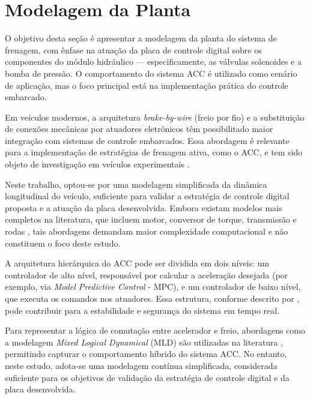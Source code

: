 \section{Modelagem da Planta}
\label{sec:controle-4-1}

O objetivo desta seção é apresentar a modelagem da planta do sistema de frenagem, com ênfase na atuação da placa de controle digital sobre os componentes do módulo hidráulico — especificamente, as válvulas solenoides e a bomba de pressão. O comportamento do sistema ACC é utilizado como cenário de aplicação, mas o foco principal está na implementação prática do controle embarcado.

Em veículos modernos, a arquitetura \textit{brake-by-wire} (freio por fio) e a substituição de conexões mecânicas por atuadores eletrônicos têm possibilitado maior integração com sistemas de controle embarcados. Essa abordagem é relevante para a implementação de estratégias de frenagem ativa, como o ACC, e tem sido objeto de investigação em veículos experimentais \cite{Pananurak2009}.

Neste trabalho, optou-se por uma modelagem simplificada da dinâmica longitudinal do veículo, suficiente para validar a estratégia de controle digital proposta e a atuação da placa desenvolvida. Embora existam modelos mais completos na literatura, que incluem motor, conversor de torque, transmissão e rodas \cite{LuuAndLupu2019}, tais abordagens demandam maior complexidade computacional e não constituem o foco deste estudo.

A arquitetura hierárquica do ACC pode ser dividida em dois níveis: um controlador de alto nível, responsável por calcular a aceleração desejada (por exemplo, via \textit{Model Predictive Control} - MPC), e um controlador de baixo nível, que executa os comandos nos atuadores. Essa estrutura, conforme descrito por , pode contribuir para a estabilidade e segurança do sistema em tempo real.

Para representar a lógica de comutação entre acelerador e freio, abordagens como a modelagem \textit{Mixed Logical Dynamical} (MLD) são utilizadas na literatura \cite{LihuaLuo2016}, permitindo capturar o comportamento híbrido do sistema ACC. No entanto, neste estudo, adota-se uma modelagem contínua simplificada, considerada suficiente para os objetivos de validação da estratégia de controle digital e da placa desenvolvida.


